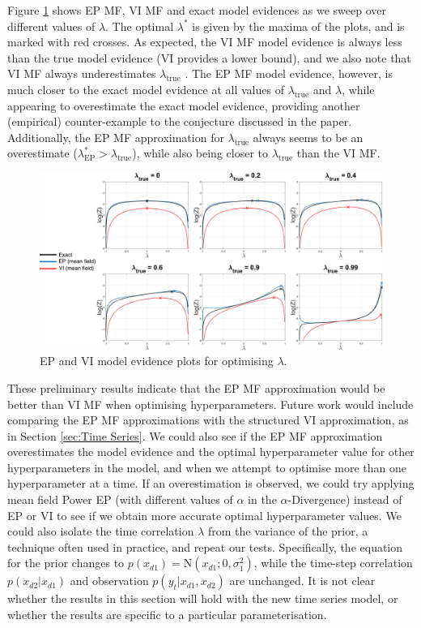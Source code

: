 \documentclass{article}
\begin{document}
Figure \ref{fig:Time series hyperparam} shows EP MF, VI MF and exact model evidences as we sweep over different values of $\lambda$. The optimal $\lambda^*$ is given by the maxima of the plots, and is marked with red crosses. As expected, the VI MF model evidence is always less than the true model evidence (VI provides a lower bound), and we also note that VI MF always underestimates $\lambda_\mathrm{true}$ \citep{turner_two_2011}. The EP MF model evidence, however, is much closer to the exact model evidence at all values of $\lambda_\mathrm{true}$ and $\lambda$, while appearing to overestimate the exact model evidence, providing another (empirical) counter-example to the conjecture discussed in the paper. Additionally, the EP MF approximation for $\lambda_\mathrm{true}$ always seems to be an overestimate ($\lambda_\mathrm{EP}^{*} > \lambda_\mathrm{true}$), while also being closer to $\lambda_\mathrm{true}$ than the VI MF.
%
\begin{figure}[h]
  \centering
  \includegraphics[scale=0.27]{Hyperparam_plots_wrt_lambda.png}
  \caption{EP and VI model evidence plots for optimising $\lambda$.}
  \label{fig:Time series hyperparam}
\end{figure}
%

These preliminary results indicate that the EP MF approximation would be better than VI MF when optimising hyperparameters. Future work would include comparing the EP MF approximations with the structured VI approximation, as in Section \ref{sec:Time Series}. We could also see if the EP MF approximation overestimates the model evidence and the optimal hyperparameter value for other hyperparameters in the model, and when we attempt to optimise more than one hyperparameter at a time. If an overestimation is observed, we could try applying mean field Power EP (with different values of $\alpha$ in the $\alpha$-Divergence) instead of EP or VI to see if we obtain more accurate optimal hyperparameter values. We could also isolate the time correlation $\lambda$ from the variance of the prior, a technique often used in practice, and repeat our tests. Specifically, the equation for the prior changes to $p(x_{d1}) = \mathrm{N}\left(x_{d1};0,\sigma_1^2\right)$, while the time-step correlation $p(x_{d2}|x_{d1})$ and observation $p(y_t|x_{d1},x_{d2})$ are unchanged. It is not clear whether the results in this section will hold with the new time series model, or whether the results are specific to a particular parameterisation.
%
\end{document}
